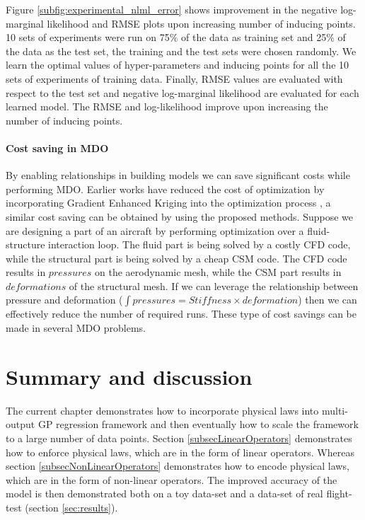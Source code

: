 Figure \ref{subfig:experimental_nlml_error} shows improvement in the negative log-marginal likelihood and RMSE plots upon increasing number of inducing points. 10 sets of experiments were run on 75\% of the data as training set and 25\% of the data as the test set, the training and the test sets were chosen randomly. We learn the optimal values of hyper-parameters and inducing points for all the 10 sets of experiments of training data. Finally, RMSE values are evaluated with respect to the test set and negative log-marginal likelihood are evaluated for each learned model. The RMSE and log-likelihood improve upon increasing the number of inducing points. 

\paragraph{Cost saving in MDO}
By enabling relationships in building models we can save significant costs while performing MDO. Earlier works have reduced the cost of optimization by incorporating Gradient Enhanced Kriging into the optimization process \cite{liem2015surrogate}, a similar cost saving can be obtained by using the proposed methods. Suppose we are designing a part of an aircraft by performing optimization over a fluid-structure interaction loop. The fluid part is being solved by a costly CFD code, while the structural part is being solved by a cheap CSM code. The CFD code results in $pressures$ on the aerodynamic mesh, while the CSM part results in $deformations$ of the structural mesh. If we can leverage the relationship between pressure and deformation ($\int pressures = Stiffness \times deformation$) then we can effectively reduce the number of required runs. These type of cost savings can be made in several MDO problems. 


\section{Summary and discussion}
The current chapter demonstrates how to incorporate physical laws into multi-output GP regression framework and then eventually how to scale the framework to a large number of data points. Section \ref{subsecLinearOperators} demonstrates how to enforce physical laws, which are in the form of linear operators. Whereas section \ref{subsecNonLinearOperators} demonstrates how to encode physical laws, which are in the form of non-linear operators. The improved accuracy of the model is then demonstrated both on a toy data-set and a data-set of real flight-test (section \ref{sec:results}). 


